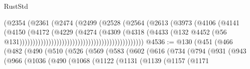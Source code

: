 \begin{lexlean}{RustStd}
\begin{coremodule}
                                                            (@2354
                                                              (@2361
                                                                (@2474
                                                                  (@2499
                                                                    (@2528
                                                                      (@2564
                                                                        (@2613
                                                                          (@3973
                                                                            (@4106
                                                                              (@4141
                                                                                (@4150
                                                                                  (@4172
                                                                                    (@4229
                                                                                      (@4274
                                                                                        (@4309
                                                                                          (@4318
                                                                                            (@4433
                                                                                              (@132
                                                                                                @4452
                                                                                                (@56
                                                                                                  @131)))))))))))))))))))))))))))))))))))))))))))))))
@4536 := @130
    (@451
      (@466
        (@482
          (@490
            (@510
              (@526
                (@569
                  (@583
                    (@602
                      (@616
                        (@734
                          (@794
                            (@931
                              (@943
                                (@966
                                  (@1036
                                    (@490
                                      (@1068
                                        (@1122
                                          (@1131
                                            (@1139
                                              (@1157
                                                (@1171

\end{coremodule}
\end{lexlean}
